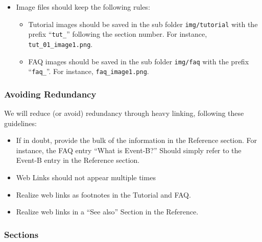\begin{itemize}
  \item Image files should keep the following rules:
	\begin{itemize}

		\item Tutorial images should be saved in the sub folder \texttt{img/tutorial} with the prefix ``\texttt{tut\_}'' following the section number. For instance, \texttt{tut\_01\_image1.png}.

		\item FAQ images should be saved in the sub folder \texttt{img/faq} with the prefix ``\texttt{faq\_}''. For instance, \texttt{faq\_image1.png}.

	\end{itemize} 

\end{itemize}

\subsubsection{Avoiding Redundancy}

We will reduce (or avoid) redundancy through heavy linking, following these guidelines:

\begin{itemize}
	\item If in doubt, provide the bulk of the information in the Reference section.  For instance, the FAQ entry ``What is Event-B?''  Should simply refer to the Event-B entry in the Reference section.
	\item Web Links should not appear multiple times
	\item Realize web links as footnotes in the Tutorial and FAQ.
	\item Realize web links in a ``See also'' Section in the Reference.
\end{itemize}

\subsubsection{Sections}

